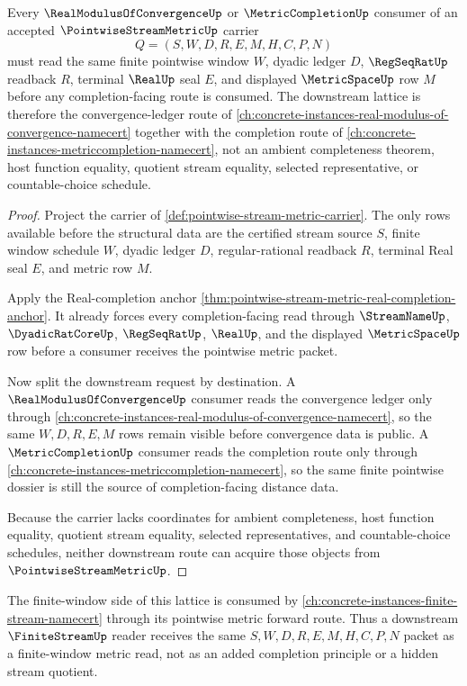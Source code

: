 \begin{theorem}
\label{thm:pointwise-stream-metric-dossier-lattice-route}
Every $\RealModulusOfConvergenceUp$ or $\MetricCompletionUp$ consumer of an accepted $\PointwiseStreamMetricUp$ carrier
$$
Q=(S,W,D,R,E,M,H,C,P,N)
$$
must read the same finite pointwise window $W$, dyadic ledger $D$, $\RegSeqRatUp$ readback $R$, terminal $\RealUp$ seal $E$, and displayed $\MetricSpaceUp$ row $M$ before any completion-facing route is consumed. The downstream lattice is therefore the convergence-ledger route of \autoref{ch:concrete-instances-real-modulus-of-convergence-namecert} together with the completion route of \autoref{ch:concrete-instances-metriccompletion-namecert}, not an ambient completeness theorem, host function equality, quotient stream equality, selected representative, or countable-choice schedule.
\end{theorem}
\begin{proof}
Project the carrier of \autoref{def:pointwise-stream-metric-carrier}. The only rows available before the structural data are the certified stream source $S$, finite window schedule $W$, dyadic ledger $D$, regular-rational readback $R$, terminal Real seal $E$, and metric row $M$.

Apply the Real-completion anchor \autoref{thm:pointwise-stream-metric-real-completion-anchor}. It already forces every completion-facing read through $\StreamNameUp$, $\DyadicRatCoreUp$, $\RegSeqRatUp$, $\RealUp$, and the displayed $\MetricSpaceUp$ row before a consumer receives the pointwise metric packet.

Now split the downstream request by destination. A $\RealModulusOfConvergenceUp$ consumer reads the convergence ledger only through \autoref{ch:concrete-instances-real-modulus-of-convergence-namecert}, so the same $W,D,R,E,M$ rows remain visible before convergence data is public. A $\MetricCompletionUp$ consumer reads the completion route only through \autoref{ch:concrete-instances-metriccompletion-namecert}, so the same finite pointwise dossier is still the source of completion-facing distance data.

Because the carrier lacks coordinates for ambient completeness, host function equality, quotient stream equality, selected representatives, and countable-choice schedules, neither downstream route can acquire those objects from $\PointwiseStreamMetricUp$.
\end{proof}

The finite-window side of this lattice is consumed by \autoref{ch:concrete-instances-finite-stream-namecert} through its pointwise metric forward route. Thus a downstream $\FiniteStreamUp$ reader receives the same $S,W,D,R,E,M,H,C,P,N$ packet as a finite-window metric read, not as an added completion principle or a hidden stream quotient.

